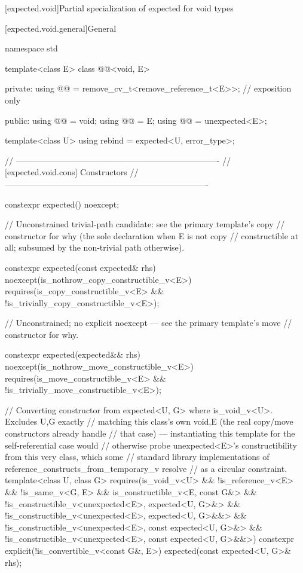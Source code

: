 [expected.void]{Partial specialization of expected for void types}

[expected.void.general]{General}

\begin{codeblock}
namespace std {
  template<class E>
  class @@<void, E> {
  private:
    using @@ = remove_cv_t<remove_reference_t<E>>; // exposition only

  public:
    using @@ = void;
    using @@ = E;
    using @@ = unexpected<E>;

    template<class U> using rebind = expected<U, error_type>;

    // -------------------------------------------------------------------------
    // [expected.void.cons] Constructors
    // -------------------------------------------------------------------------

    constexpr expected() noexcept;

    // Unconstrained trivial-path candidate: see the primary template's copy
    // constructor for why (the sole declaration when E is not copy
    // constructible at all; subsumed by the non-trivial path otherwise).

    constexpr expected(const expected& rhs) noexcept(is_nothrow_copy_constructible_v<E>)
      requires(is_copy_constructible_v<E> && !is_trivially_copy_constructible_v<E>);

    // Unconstrained; no explicit noexcept — see the primary template's move
    // constructor for why.

    constexpr expected(expected&& rhs) noexcept(is_nothrow_move_constructible_v<E>)
      requires(is_move_constructible_v<E> && !is_trivially_move_constructible_v<E>);

    // Converting constructor from expected<U, G> where is_void_v<U>. Excludes U,G exactly
    // matching this class's own void,E (the real copy/move constructors already handle
    // that case) — instantiating this template for the self-referential case would
    // otherwise probe unexpected<E>'s constructibility from this very class, which some
    // standard library implementations of reference_constructs_from_temporary_v resolve
    // as a circular constraint.
    template<class U, class G>
      requires(is_void_v<U> && !is_reference_v<E> && !is_same_v<G, E> &&
               is_constructible_v<E, const G&> &&
               !is_constructible_v<unexpected<E>, expected<U, G>&> &&
               !is_constructible_v<unexpected<E>, expected<U, G>&&> &&
               !is_constructible_v<unexpected<E>, const expected<U, G>&> &&
               !is_constructible_v<unexpected<E>, const expected<U, G>&&>)
    constexpr explicit(!is_convertible_v<const G&, E>)
        expected(const expected<U, G>& rhs);

}}
\end{codeblock}
